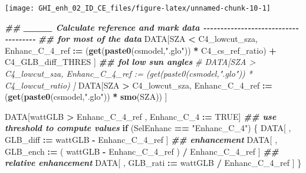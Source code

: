 \documentclass[
  10pt,
  a4paper,oneside]{article}
\newenvironment{Shaded}{\begin{snugshade}}{\end{snugshade}}
\newcommand{\AttributeTok}[1]{\textcolor[rgb]{0.13,0.29,0.53}{#1}}
\newcommand{\CommentTok}[1]{\textcolor[rgb]{0.56,0.35,0.01}{\textit{#1}}}
\newcommand{\ConstantTok}[1]{\textcolor[rgb]{0.56,0.35,0.01}{#1}}
\newcommand{\ControlFlowTok}[1]{\textcolor[rgb]{0.13,0.29,0.53}{\textbf{#1}}}
\newcommand{\DecValTok}[1]{\textcolor[rgb]{0.00,0.00,0.81}{#1}}
\newcommand{\DocumentationTok}[1]{\textcolor[rgb]{0.56,0.35,0.01}{\textbf{\textit{#1}}}}
\newcommand{\FunctionTok}[1]{\textcolor[rgb]{0.13,0.29,0.53}{\textbf{#1}}}
\newcommand{\NormalTok}[1]{#1}
\newcommand{\SpecialCharTok}[1]{\textcolor[rgb]{0.81,0.36,0.00}{\textbf{#1}}}
\newcommand{\StringTok}[1]{\textcolor[rgb]{0.31,0.60,0.02}{#1}}
\begin{document}
\begin{Shaded}
\end{Shaded}

\begin{center}\texttt{[image: GHI\_enh\_02\_ID\_CE\_files/figure-latex/unnamed-chunk-10-1]} \end{center}

\begin{Shaded}
\begin{Highlighting}[]
\DocumentationTok{\#\# \_\_\_\_ Calculate reference and mark data  {-}{-}{-}{-}{-}{-}{-}{-}{-}{-}{-}{-}{-}{-}{-}{-}{-}{-}{-}{-}{-}{-}{-}{-}{-}{-}{-}{-}{-}{-}{-}{-}{-}{-}{-}{-}{-}}
\DocumentationTok{\#\# for most of the data}
\NormalTok{DATA[SZA }\SpecialCharTok{\textless{}}\NormalTok{ C4\_lowcut\_sza, Enhanc\_C\_4\_ref }\SpecialCharTok{:=}\NormalTok{ (}\FunctionTok{get}\NormalTok{(}\FunctionTok{paste0}\NormalTok{(csmodel,}\StringTok{".glo"}\NormalTok{)) }\SpecialCharTok{*}\NormalTok{ C4\_cs\_ref\_ratio) }\SpecialCharTok{+}\NormalTok{ C4\_GLB\_diff\_THRES ]}
\DocumentationTok{\#\# fol low sun angles}
\CommentTok{\# DATA[SZA \textgreater{} C4\_lowcut\_sza, Enhanc\_C\_4\_ref := (get(paste0(csmodel,".glo")) * C4\_lowcut\_ratio) ]}
\NormalTok{DATA[SZA }\SpecialCharTok{\textgreater{}}\NormalTok{ C4\_lowcut\_sza, Enhanc\_C\_4\_ref }\SpecialCharTok{:=}\NormalTok{ (}\FunctionTok{get}\NormalTok{(}\FunctionTok{paste0}\NormalTok{(csmodel,}\StringTok{".glo"}\NormalTok{)) }\SpecialCharTok{*} \FunctionTok{smo}\NormalTok{(SZA)) ]}

\NormalTok{DATA[wattGLB }\SpecialCharTok{\textgreater{}}\NormalTok{ Enhanc\_C\_4\_ref ,}
\NormalTok{     Enhanc\_C\_4 }\SpecialCharTok{:=} \ConstantTok{TRUE}\NormalTok{]}
\DocumentationTok{\#\# use threshold to compute values}
\ControlFlowTok{if}\NormalTok{ (SelEnhanc }\SpecialCharTok{==} \StringTok{"Enhanc\_C\_4"}\NormalTok{) \{}
\NormalTok{    DATA[ , GLB\_diff }\SpecialCharTok{:=}\NormalTok{   wattGLB }\SpecialCharTok{{-}}\NormalTok{ Enhanc\_C\_4\_ref                    ] }\DocumentationTok{\#\# enhancement}
\NormalTok{    DATA[ , GLB\_ench }\SpecialCharTok{:=}\NormalTok{ ( wattGLB }\SpecialCharTok{{-}}\NormalTok{ Enhanc\_C\_4\_ref ) }\SpecialCharTok{/}\NormalTok{ Enhanc\_C\_4\_ref ] }\DocumentationTok{\#\# relative enhancement}
\NormalTok{    DATA[ , GLB\_rati }\SpecialCharTok{:=}\NormalTok{   wattGLB }\SpecialCharTok{/}\NormalTok{ Enhanc\_C\_4\_ref                    ]}
\NormalTok{\}}
\end{Highlighting}
\end{Shaded}
\end{document}
